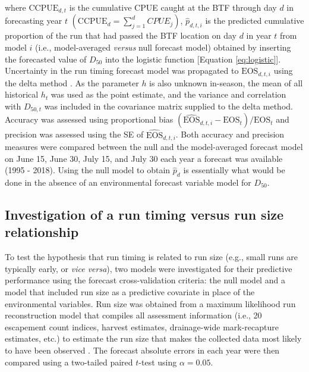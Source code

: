 \documentclass[12pt,]{book}
\theoremstyle{definition}
\theoremstyle{definition}
\theoremstyle{definition}
\theoremstyle{remark}
\begin{document}
\noindent
where \(\text{CCPUE}_{d,t}\) is the cumulative CPUE caught at the BTF
through day \(d\) in forecasting year \(t\)
\(\left(\text{CCPUE}_d = \sum_{j=1}^{d} CPUE_j \right)\),
\(\hat{p}_{d,t,i}\) is the predicted cumulative proportion of the run
that had passed the BTF location on day \(d\) in year \(t\) from model
\(i\) (i.e., model-averaged \emph{versus} null forecast model) obtained
by inserting the forecasted value of \(D_{50}\) into the logistic
function {[}Equation \eqref{eq:logistic}{]}. Uncertainty in the run timing
forecast model was propagated to \(\text{EOS}_{d,t,i}\) using the delta
method \citep{bolker-2008}. As the parameter \(h\) is also unknown
in-season, the mean of all historical \(h_t\) was used as the point
estimate, and the variance and correlation with \(D_{50,t}\) was
included in the covariance matrix supplied to the delta method. Accuracy
was assessed using proportional bias
\(\left(\widehat{\text{EOS}}_{d,t,i} - \text{EOS}_t\right)/\text{EOS}_t\)
and precision was assessed using the SE of
\(\widehat{\text{EOS}}_{d,t,i}\). Both accuracy and precision measures
were compared between the null and the model-averaged forecast model on
June 15, June 30, July 15, and July 30 each year a forecast was
available (1995 - 2018). Using the null model to obtain \(\hat{p}_d\) is
essentially what would be done in the absence of an environmental
forecast variable model for \(D_{50}\).

\subsection{Investigation of a run timing versus run size
relationship}\label{investigation-of-a-run-timing-versus-run-size-relationship}

\noindent
To test the hypothesis that run timing is related to run size (e.g.,
small runs are typically early, or \emph{vice versa}), two models were
investigated for their predictive performance using the forecast
cross-validation criteria: the null model and a model that included run
size as a predictive covariate in place of the environmental variables.
Run size was obtained from a maximum likelihood run reconstruction model
that compiles all assessment information (i.e., 20 escapement count
indices, harvest estimates, drainage-wide mark-recapture estimates,
etc.) to estimate the run size that makes the collected data most likely
to have been observed \citep{bue-etal-2012}. The forecast absolute
errors in each year were then compared using a two-tailed paired
\(t\)-test using \(\alpha = 0.05\).
\end{document}
